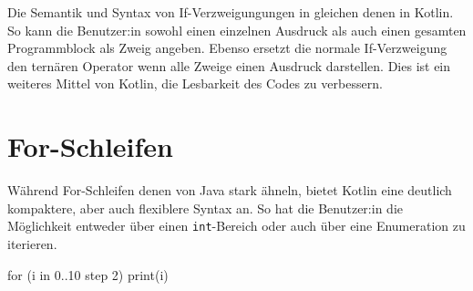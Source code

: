 Die Semantik und Syntax von If-Verzweigungungen in \toya gleichen denen in Kotlin. So kann die Benutzer:in sowohl einen einzelnen Ausdruck als auch einen gesamten Programmblock als Zweig angeben. Ebenso ersetzt die normale If-Verzweigung den ternären Operator wenn alle Zweige einen Ausdruck darstellen. Dies ist ein weiteres Mittel von Kotlin, die Lesbarkeit des Codes zu verbessern. 

\section{For-Schleifen}

Während \toya For-Schleifen denen von Java stark ähneln, bietet Kotlin eine deutlich kompaktere, aber auch flexiblere Syntax an. So hat die Benutzer:in die Möglichkeit entweder über einen \texttt{int}-Bereich oder auch über eine Enumeration zu iterieren. 

\begin{KotlinCode}[numbers=none, caption={Einfache For-Schleife in Kotlin}]
for (i in 0..10 step 2) {
    print(i)
}
\end{KotlinCode}